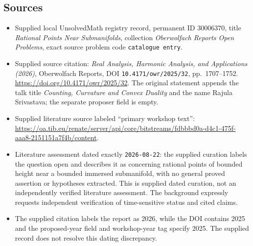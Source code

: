 \documentclass[11pt]{article}
\begin{document}
\subsection{Sources}
\begin{itemize}
\item Supplied local UnsolvedMath registry record, permanent ID \(30006370\), title \emph{Rational Points Near Submanifolds}, collection \emph{Oberwolfach Reports Open Problems}, exact source problem code \texttt{catalogue entry}.
\item Supplied source citation: \emph{Real Analysis, Harmonic Analysis, and Applications (2026)}, Oberwolfach Reports, DOI \texttt{10.4171/owr/2025/32}, pp.\ 1707--1752. \url{https://doi.org/10.4171/owr/2025/32}. The original statement appends the talk title \emph{Counting, Curvature and Convex Duality} and the name Rajula Srivastava; the separate proposer field is empty.
\item Supplied literature source labeled ``primary workshop text'': \url{https://oa.tib.eu/renate/server/api/core/bitstreams/fdbbbd0a-d4c1-475f-aaa8-2151151a7f4b/content}.
\item Literature assessment dated exactly \texttt{2026-08-22}: the supplied curation labels the question open and describes it as concerning rational points of bounded height near a bounded immersed submanifold, with no general proved assertion or hypotheses extracted. This is supplied dated curation, not an independently verified literature assessment. The background expressly requests independent verification of time-sensitive status and cited claims.
\item The supplied citation labels the report as 2026, while the DOI contains 2025 and the proposed-year field and workshop-year tag specify 2025. The supplied record does not resolve this dating discrepancy.
\end{itemize}
\end{document}
